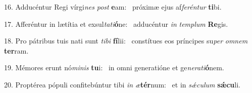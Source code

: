 16. Adducéntur Regi vírgi\textit{nes} \textit{post} \textbf{e}am: \ast\  próximæ ejus af\textit{fe}\textit{rén}\textit{tur} \textbf{ti}bi.\

17. Afferéntur in lætítia et exsul\textit{ta}\textit{ti}\textbf{ó}ne: \ast\  adducéntur \textit{in} \textit{tem}\textit{plum} \textbf{Re}gis.\

18. Pro pátribus tuis nati sunt \textit{ti}\textit{bi} \textbf{fí}lii: \ast\  constítues eos príncipes su\textit{per} \textit{om}\textit{nem} \textbf{ter}ram.\

19. Mémores erunt nó\textit{mi}\textit{nis} \textbf{tu}i: \ast\  in omni generatióne et ge\textit{ne}\textit{ra}\textit{ti}\textbf{ó}nem.\

20. Proptérea pópuli confitebúntur tibi \textit{in} \textit{æ}\textbf{tér}num: \ast\  et in \textit{sǽ}\textit{cu}\textit{lum} \textbf{sǽ}\textbf{cu}li.\

